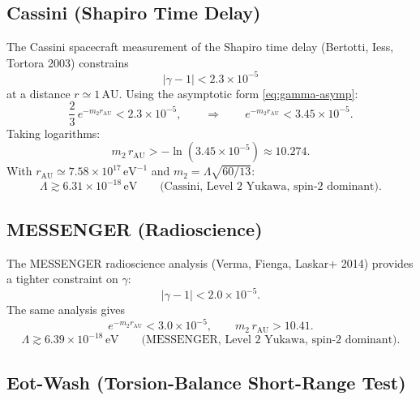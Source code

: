 \documentclass[11pt,a4paper]{article}
\begin{document}
\subsection{Cassini (Shapiro Time Delay)}
\label{sec:cassini}

The Cassini spacecraft measurement of the Shapiro time delay
(Bertotti, Iess, Tortora 2003) constrains
\begin{equation}
  |\gamma - 1| < 2.3 \times 10^{-5}
\end{equation}
at a distance $r \simeq 1\,\mathrm{AU}$.  Using the asymptotic form
\eqref{eq:gamma-asymp}:
\begin{equation}
  \frac{2}{3}\,e^{-m_2 r_\mathrm{AU}} < 2.3 \times 10^{-5},
  \qquad \Longrightarrow \qquad
  e^{-m_2 r_\mathrm{AU}} < 3.45 \times 10^{-5}.
\end{equation}
Taking logarithms:
\begin{equation}
  m_2\,r_\mathrm{AU} > -\ln(3.45 \times 10^{-5}) \approx 10.274.
\end{equation}
With $r_\mathrm{AU} \simeq 7.58 \times 10^{17}\,\mathrm{eV}^{-1}$ and
$m_2 = \Lambda\sqrt{60/13}$:
\begin{equation}\label{eq:cassini-bound}
  \boxed{
  \Lambda \gtrsim 6.31 \times 10^{-18}\,\mathrm{eV}
  \qquad \text{(Cassini, Level~2 Yukawa, spin-2 dominant).}}
\end{equation}

\subsection{MESSENGER (Radioscience)}
\label{sec:messenger}

The MESSENGER radioscience analysis (Verma, Fienga, Laskar+ 2014)
provides a tighter constraint on $\gamma$:
\begin{equation}
  |\gamma - 1| < 2.0 \times 10^{-5}.
\end{equation}
The same analysis gives
\begin{equation}
  e^{-m_2 r_\mathrm{AU}} < 3.0 \times 10^{-5},
  \qquad
  m_2\,r_\mathrm{AU} > 10.41.
\end{equation}
\begin{equation}\label{eq:messenger-bound}
  \boxed{
  \Lambda \gtrsim 6.39 \times 10^{-18}\,\mathrm{eV}
  \qquad \text{(MESSENGER, Level~2 Yukawa, spin-2 dominant).}}
\end{equation}

\subsection{Eot-Wash (Torsion-Balance Short-Range Test)}
\label{sec:eotwash}
\end{document}
